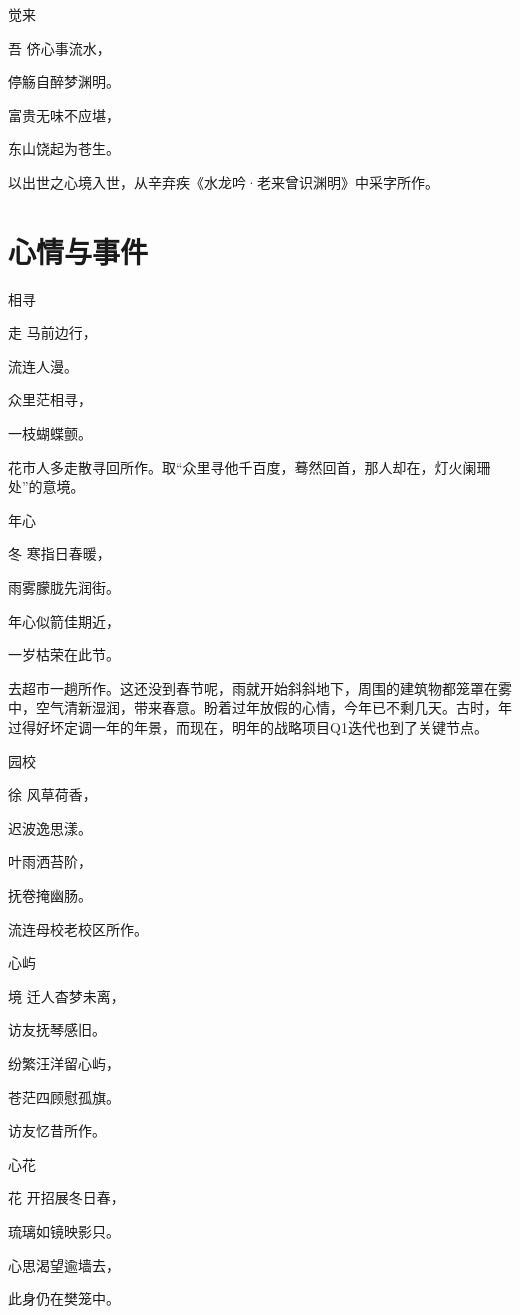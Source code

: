 \documentclass{article}
\newenvironment{poem}[3]{
\begin{minipage}{\textwidth}
\begin{pinyinscope}\begin{center}\Large\linespread{1.4}\selectfont #2\end{center}\end{pinyinscope}
\begin{pinyinscope}
	\begin{center}
	\Large\linespread{1.4}\rmfamily\selectfont #3
}{\end{center}
\end{pinyinscope}
\end{minipage}
}
\begin{document}
\begin{poem}{}{觉来}
吾侪心事{}流水，

停觞自醉梦渊明。

富贵无味不应堪，

东山饶起为苍生。
\end{poem}

以出世之心境入世，从辛弃疾《水龙吟·老来曾识渊明》中采字所作。

\section{心情与事件}

\begin{poem}{}{相寻}
走马前边行，

流连人{}漫。

众里茫相寻，

一枝蝴蝶颤。
\end{poem}

花市人多走散寻回所作。取“众里寻他千百度，蓦然回首，那人却在，灯火阑珊处”的意境。

\begin{poem}{}{年心}
冬寒指日{}春暖，

雨雾朦胧先润街。

年心似箭佳期近，

一岁枯荣在此节。
\end{poem}

去超市一趟所作。这还没到春节呢，雨就开始斜斜地下，周围的建筑物都笼罩在雾中，空气清新湿润，带来春意。盼着过年放假的心情，今年已不剩几天。古时，年过得好坏定调一年的年景，而现在，明年的战略项目Q1迭代也到了关键节点。

\begin{poem}{}{园校}
徐风草荷香，

迟波逸思漾。

叶雨洒苔阶，

抚卷掩幽肠。
\end{poem}

流连母校老校区所作。

\begin{poem}{}{心屿}
境迁人杳梦未离，

访友抚琴感旧{}。

纷繁汪洋留心屿，

苍茫四顾慰孤旗。
\end{poem}

访友忆昔所作。

\begin{poem}{}{心花}
花开招展冬日春，

琉璃如镜映影只。

心思渴望逾墙去，

此身仍在樊笼中。
\end{poem}
\end{document}
